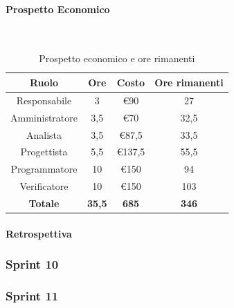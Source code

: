 \documentclass{article}
\begin{document}
                \paragraph{Prospetto Economico}\mbox{}\\
                \begin{table}[H]
                    \centering
                    \begin{tabular}{|c|c|c|c|}
                    \hline
                    \textbf{Ruolo}  & \textbf{Ore}  & \textbf{Costo} & \textbf{Ore rimanenti} \\ \hline
                    Responsabile    & 3             & €90            & 27                     \\ \hline
                    Amministratore  & 3,5           & €70            & 32,5                   \\ \hline
                    Analista        & 3,5           & €87,5          & 33,5                   \\ \hline
                    Progettista     & 5,5           & €137,5         & 55,5                   \\ \hline
                    Programmatore   & 10            & €150           & 94                    \\ \hline
                    Verificatore    & 10            & €150           & 103                    \\ \hline
                    \textbf{Totale} & \textbf{35,5} & \textbf{685}   & \textbf{346}         \\ \hline
                    \end{tabular}
                    \caption{Prospetto economico e ore rimanenti}
                \end{table}

                \paragraph{Retrospettiva}
            \subsubsection{Sprint 10}
            \subsubsection{Sprint 11}
\end{document}

